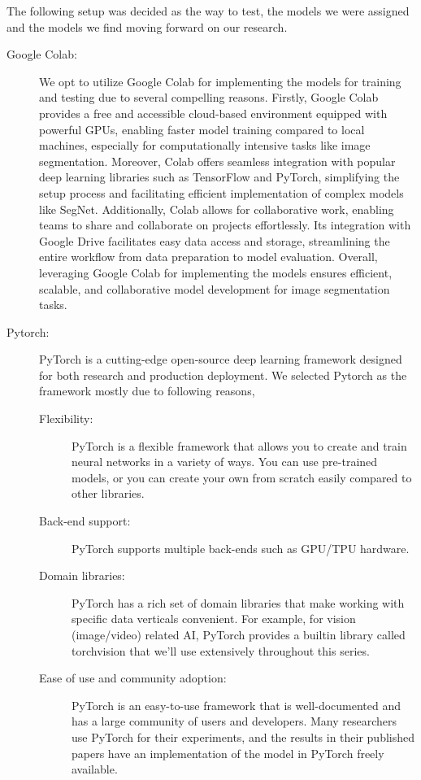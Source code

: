 The following setup was decided as the way to test, the models we were assigned and the models we find moving forward on our research.

\begin{description}
	\item[Google Colab:] We opt to utilize Google Colab for implementing the models for training and testing due to several compelling reasons. Firstly, Google Colab provides a free and accessible cloud-based environment equipped with powerful GPUs, enabling faster model training compared to local machines, especially for computationally intensive tasks like image segmentation. Moreover, Colab offers seamless integration with popular deep learning libraries such as TensorFlow and PyTorch, simplifying the setup process and facilitating efficient implementation of complex models like SegNet. Additionally, Colab allows for collaborative work, enabling teams to share and collaborate on projects effortlessly. Its integration with Google Drive facilitates easy data access and storage, streamlining the entire workflow from data preparation to model evaluation. Overall, leveraging Google Colab for implementing the models ensures efficient, scalable, and collaborative model development for image segmentation tasks.

	\item[Pytorch:] PyTorch is a cutting-edge open-source deep learning framework designed for both research and production deployment. We selected Pytorch as the framework mostly due to following reasons,

	      \begin{description}
		      \item[Flexibility:] PyTorch is a flexible framework that allows you to create and train neural networks in a variety of ways. You can use pre-trained models, or you can create your own from scratch easily compared to other libraries.
		      \item[Back-end support:] PyTorch supports multiple back-ends such as GPU/TPU hardware.
		      \item[Domain libraries:] PyTorch has a rich set of domain libraries that make working with specific data verticals convenient. For example, for vision (image/video) related AI, PyTorch provides a builtin library called torchvision that we'll use extensively throughout this series.
		      \item[Ease of use and community adoption:] PyTorch is an easy-to-use framework that is well-documented and has a large community of users and developers. Many researchers use PyTorch for their experiments, and the results in their published papers have an implementation of the model in PyTorch freely available.
	      \end{description}
\end{description}
